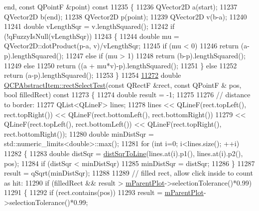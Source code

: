 \begin{DoxyCode}
      end, \textcolor{keyword}{const} QPointF &point)\textcolor{keyword}{ const}
11235 \textcolor{keyword}{}\{
11236   QVector2D a(start);
11237   QVector2D b(end);
11238   QVector2D p(point);
11239   QVector2D v(b-a);
11240   
11241   \textcolor{keywordtype}{double} vLengthSqr = v.lengthSquared();
11242   \textcolor{keywordflow}{if} (!qFuzzyIsNull(vLengthSqr))
11243   \{
11244     \textcolor{keywordtype}{double} mu = QVector2D::dotProduct(p-a, v)/vLengthSqr;
11245     \textcolor{keywordflow}{if} (mu < 0)
11246       \textcolor{keywordflow}{return} (a-p).lengthSquared();
11247     \textcolor{keywordflow}{else} \textcolor{keywordflow}{if} (mu > 1)
11248       \textcolor{keywordflow}{return} (b-p).lengthSquared();
11249     \textcolor{keywordflow}{else}
11250       \textcolor{keywordflow}{return} ((a + mu*v)-p).lengthSquared();
11251   \} \textcolor{keywordflow}{else}
11252     \textcolor{keywordflow}{return} (a-p).lengthSquared();
11253 \}
11254 
\hypertarget{a00115_source_l11272}{}\hyperlink{a00022_a4c0e14c4e92df91174cb7183fb363069}{11272} \textcolor{keywordtype}{double} \hyperlink{a00022_a4c0e14c4e92df91174cb7183fb363069}{QCPAbstractItem::rectSelectTest}(\textcolor{keyword}{const} QRectF &rect, \textcolor{keyword}{const} QPointF &
      pos, \textcolor{keywordtype}{bool} filledRect)\textcolor{keyword}{ const}
11273 \textcolor{keyword}{}\{
11274   \textcolor{keywordtype}{double} result = -1;
11275 
11276   \textcolor{comment}{// distance to border:}
11277   QList<QLineF> lines;
11278   lines << QLineF(rect.topLeft(), rect.topRight()) << QLineF(rect.bottomLeft(), rect.bottomRight())
11279         << QLineF(rect.topLeft(), rect.bottomLeft()) << QLineF(rect.topRight(), rect.bottomRight());
11280   \textcolor{keywordtype}{double} minDistSqr = std::numeric\_limits<double>::max();
11281   \textcolor{keywordflow}{for} (\textcolor{keywordtype}{int} i=0; i<lines.size(); ++i)
11282   \{
11283     \textcolor{keywordtype}{double} distSqr = \hyperlink{a00022_acdca343717d625b8abb3c3e38c0ed39d}{distSqrToLine}(lines.at(i).p1(), lines.at(i).p2(), pos);
11284     \textcolor{keywordflow}{if} (distSqr < minDistSqr)
11285       minDistSqr = distSqr;
11286   \}
11287   result = qSqrt(minDistSqr);
11288   
11289   \textcolor{comment}{// filled rect, allow click inside to count as hit:}
11290   \textcolor{keywordflow}{if} (filledRect && result > \hyperlink{a00044_aa2a528433e44db02b8aef23c1f9f90ed}{mParentPlot}->selectionTolerance()*0.99)
11291   \{
11292     \textcolor{keywordflow}{if} (rect.contains(pos))
11293       result = \hyperlink{a00044_aa2a528433e44db02b8aef23c1f9f90ed}{mParentPlot}->selectionTolerance()*0.99;

\end{DoxyCode}
